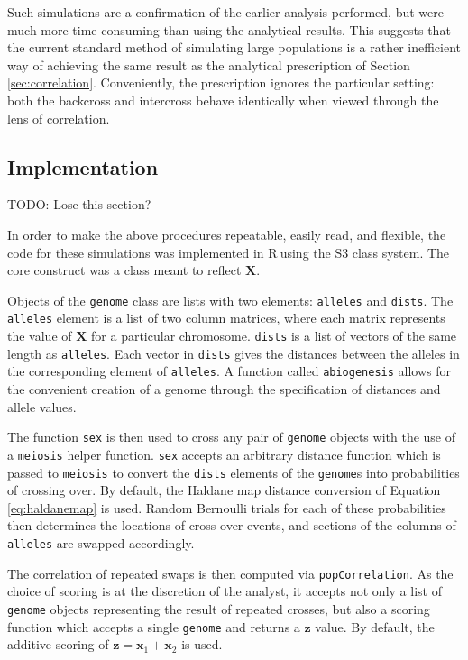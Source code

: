 \documentclass{article}
\newcommand{\code}[1]{\texttt{#1}}
\newcommand*{\R}{\textsf{R}$~$}
\newcommand{\ve}[1]{\mathbf{#1}}           %
\newcommand{\m}[1]{\mathbf{#1}}               %
\newcommand{\TODO}[1]{{\color{brickred} TODO:  {#1}}}
\begin{document}
Such simulations are a confirmation of the earlier analysis performed, but were much more time consuming than using the analytical results. This suggests that the current standard method of simulating large populations is a rather inefficient way of achieving the same result as the analytical prescription of Section \ref{sec:correlation}. Conveniently, the prescription ignores the particular setting: both the backcross and intercross behave identically when viewed through the lens of correlation.

\subsection{Implementation}

\TODO{Lose this section?}

In order to make the above procedures repeatable, easily read, and flexible, the code for these simulations was implemented in \R using the S3 class system. The core construct was a class meant to reflect $\m{X}$.

Objects of the \code{genome} class are lists with two elements: \code{alleles} and \code{dists}. The \code{alleles} element is a list of two column matrices, where each matrix represents the value of $\m{X}$ for a particular chromosome. \code{dists} is a list of vectors of the same length as \code{alleles}. Each vector in \code{dists} gives the distances between the alleles in the corresponding element of \code{alleles}. A function called \code{abiogenesis} allows for the convenient creation of a genome through the specification of distances and allele values.

The function \code{sex} is then used to cross any pair of \code{genome} objects with the use of a \code{meiosis} helper function. \code{sex} accepts an arbitrary distance function which is passed to \code{meiosis} to convert the \code{dists} elements of the \code{genome}s into probabilities of crossing over. By default, the Haldane map distance conversion of Equation \ref{eq:haldanemap} is used. Random Bernoulli trials for each of these probabilities then determines the locations of cross over events, and sections of the columns of \code{alleles} are swapped accordingly.

The correlation of repeated swaps is then computed via \code{popCorrelation}. As the choice of scoring is at the discretion of the analyst, it accepts not only a list of \code{genome} objects representing the result of repeated crosses, but also a scoring function which accepts a single \code{genome} and returns a $\ve{z}$ value. By default, the additive scoring of $\ve{z} = \ve{x}_1 + \ve{x}_2$ is used.
\end{document}
